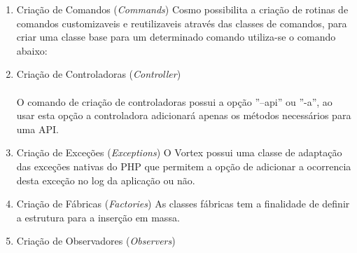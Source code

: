 \begin{enumerate}
    \item{Criação de Comandos (\textit{Commands})}
    Cosmo possibilita a criação de rotinas de comandos customizaveis e reutilizaveis através das classes de comandos, para criar uma classe base para um determinado comando utiliza-se o comando abaixo:  

    \spaceH{}
    
    \label{scripts/cosmo_make_command.bash}

    \item{Criação de Controladoras (\textit{Controller})}
    \paragraph{}
    O comando de criação de controladoras possui a opção ''--api'' ou ''-a'', ao usar esta opção a controladora adicionará apenas os métodos necessários para uma API.

    \spaceH{}
    
    \label{scripts/cosmo_make_controller.bash}

    \item{Criação de Exceções (\textit{Exceptions})}
    O Vortex possui uma classe de adaptação das exceções nativas do PHP que permitem a opção de adicionar a ocorrencia desta exceção no log da aplicação ou não.
    
    \spaceH{}
    
    \label{scripts/cosmo_make_exception.bash}

    \item{Criação de Fábricas (\textit{Factories})}
    As classes fábricas tem a finalidade de definir a estrutura para a inserção em massa.

    \spaceH{}
    
    \label{scripts/cosmo_make_factory.bash}

    \item{Criação de Observadores (\textit{Observers})}

    \spaceH{}
    
    \label{scripts/cosmo_make_observer.bash}


\end{enumerate}
